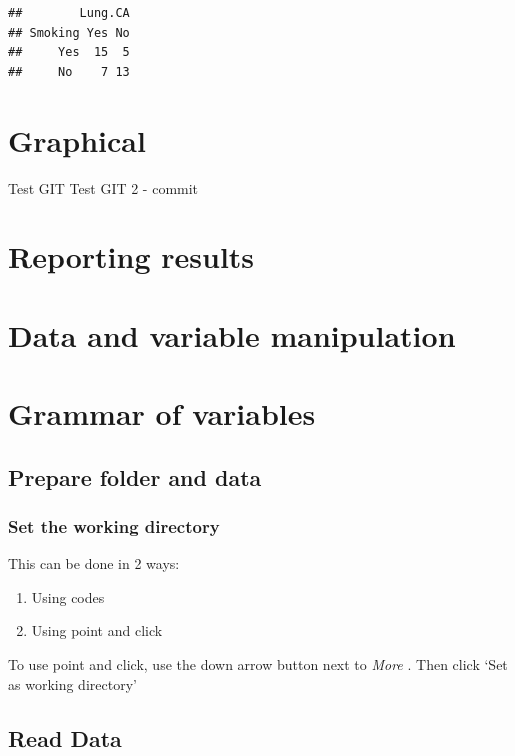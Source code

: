 \documentclass[]{book}
\providecommand{\tightlist}{%
  \setlength{\itemsep}{0pt}\setlength{\parskip}{0pt}}
\theoremstyle{definition}
\theoremstyle{definition}
\theoremstyle{remark}
\begin{document}
\begin{verbatim}
##        Lung.CA
## Smoking Yes No
##     Yes  15  5
##     No    7 13
\end{verbatim}

\chapter{Graphical}\label{graphical}

Test GIT Test GIT 2 - commit

\chapter{Reporting results}\label{reporting-results}

\chapter{Data and variable
manipulation}\label{data-and-variable-manipulation}

\chapter{Grammar of variables}\label{grammar-of-variables}

\section{Prepare folder and data}\label{prepare-folder-and-data}

\subsection{Set the working directory}\label{set-the-working-directory}

This can be done in 2 ways:

\begin{enumerate}
\def\labelenumi{\arabic{enumi}.}
\tightlist
\item
  Using codes
\item
  Using point and click
\end{enumerate}

To use point and click, use the down arrow button next to \emph{More} .
Then click `Set as working directory'

\section{Read Data}\label{read-data}
\end{document}
